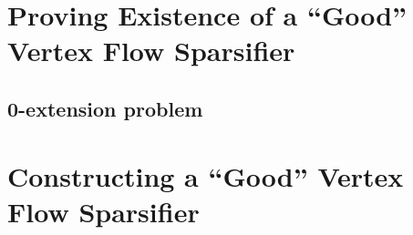 \documentclass[12pt]{article}
\begin{document}


    
    
    \section{Proving Existence of a ``Good'' Vertex Flow Sparsifier}
    

\subsection{0-extension problem}


\section{Constructing a ``Good'' Vertex Flow Sparsifier}




    
    
    
\end{document}
